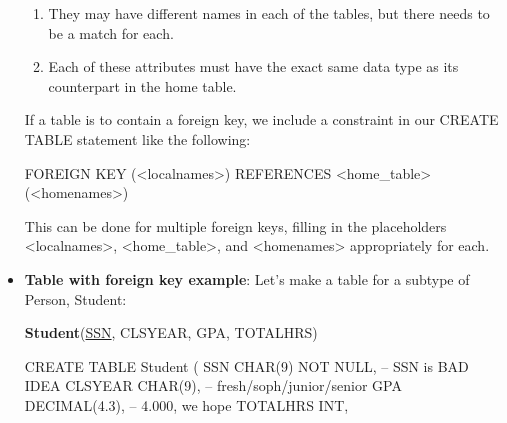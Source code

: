 \documentclass{report}
\begin{document}
\begin{itemize}
\begin{enumerate}
                \item They may have different names in each of the tables, but there needs to be a match for each.
                \item Each of these attributes must have the exact same data type as its counterpart in the home table.
            \end{enumerate}
            \bigbreak \noindent 
            If a table is to contain a foreign key, we include a constraint in our CREATE TABLE statement like the following:
            \begin{sqlcode}
                FOREIGN KEY (<localnames>) REFERENCES <home_table>(<homenames>)
            \end{sqlcode}
            This can be done for multiple foreign keys, filling in the placeholders <localnames>, <home\_table>, and <homenames> appropriately for each.
    \item \textbf{Table with foreign key example}: Let’s make a table for a subtype of Person, Student:
        \begin{center}
            \textbf{Student}(\underline{SSN}\dag, CLSYEAR, GPA, TOTALHRS)
        \end{center}
        \bigbreak \noindent 
        \begin{sqlcode}
            CREATE TABLE Student (
                SSN CHAR(9) NOT NULL, -- SSN is BAD IDEA
                CLSYEAR CHAR(9), -- fresh/soph/junior/senior
                GPA DECIMAL(4.3), -- 4.000, we hope
                TOTALHRS INT,


\end{sqlcode}
\end{itemize}
\end{document}
